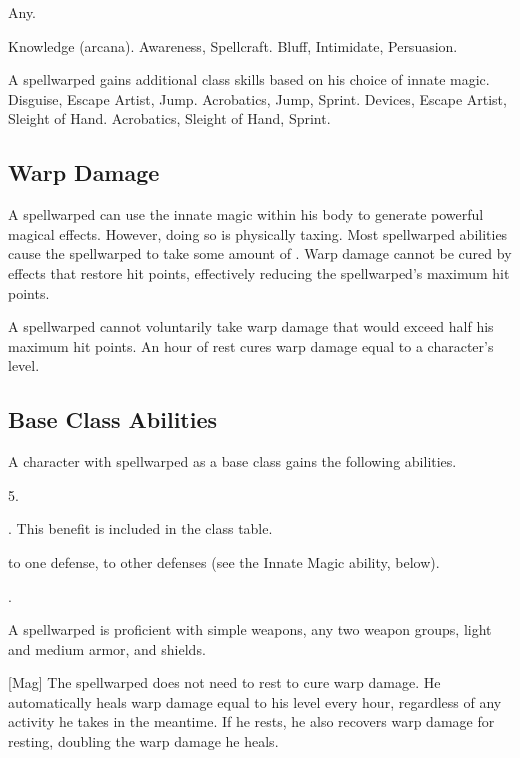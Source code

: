     Any.

     Knowledge (arcana).
     Awareness, Spellcraft.
     Bluff, Intimidate, Persuasion.

    A spellwarped gains additional class skills based on his choice of innate magic.
     Disguise, Escape Artist, Jump.
     Acrobatics, Jump, Sprint.
     Devices, Escape Artist, Sleight of Hand.
     Acrobatics, Sleight of Hand, Sprint.

    \subsection{Warp Damage}\label{Warp Damage}
        A spellwarped can use the innate magic within his body to generate powerful magical effects.
        However, doing so is physically taxing.
        Most spellwarped abilities cause the spellwarped to take some amount of .
        Warp damage cannot be cured by effects that restore hit points, effectively reducing the spellwarped's maximum hit points.

        A spellwarped cannot voluntarily take warp damage that would exceed half his maximum hit points.
        An hour of rest cures warp damage equal to a character's level.

    \subsection{Base Class Abilities}
        A character with spellwarped as a base class gains the following abilities.

         5.

         . This benefit is included in the class table.

          to one defense,  to other defenses (see the Innate Magic ability, below).

         .

        A spellwarped is proficient with simple weapons, any two weapon groups, light and medium armor, and shields.

        [Mag]
        The spellwarped does not need to rest to cure warp damage.
        He automatically heals warp damage equal to his level every hour, regardless of any activity he takes in the meantime.
        If he rests, he also recovers warp damage for resting, doubling the warp damage he heals.

